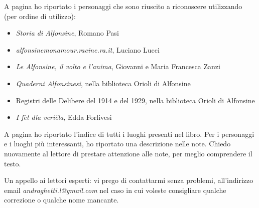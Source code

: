 \label{fonti}
\noindent A pagina \pageref{Personaggi} ho riportato i personaggi che sono riuscito a riconoscere utilizzando (per ordine di utilizzo):
\begin{itemize}\itemsep2pt
\item{\emph{Storia di Alfonsine}, Romano Pasi}
\item{\emph{alfonsinemonamour.racine.ra.it}, Luciano Lucci}
\item{\emph{Le Alfonsine, il volto e l'anima}, Giovanni e Maria Francesca Zanzi}
\item{\emph{Quaderni Alfonsinesi}, nella biblioteca Orioli di Alfonsine}
\item{Registri delle Delibere del 1914 e del 1929, nella biblioteca Orioli di Alfonsine}
\item{\emph{I fèt dla veriëla}, Edda Forlivesi}
\end{itemize}

A pagina \pageref{Luoghi} ho riportato l'indice di tutti i luoghi presenti nel libro. Per i personaggi e i luoghi più interessanti, ho riportato una descrizione nelle note. Chiedo nuovamente al lettore di prestare attenzione alle note, per meglio comprendere il testo.\\

\vspace{1cm}

Un appello ai lettori esperti: vi prego di contattarmi senza problemi, all'indirizzo email \textit{andraghetti.l@gmail.com} nel caso in cui voleste consigliare qualche correzione o qualche nome mancante.\\

